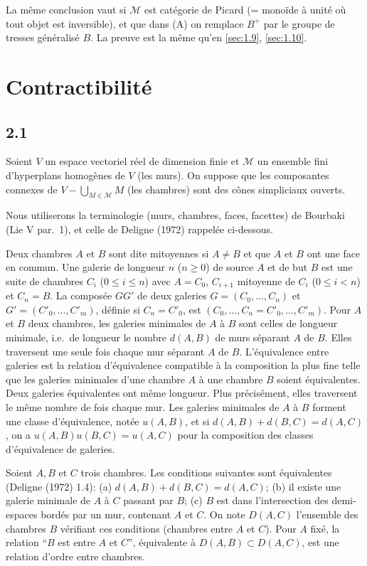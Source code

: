 \documentclass[11pt,a4paper]{article}
\theoremstyle{plain}
\theoremstyle{definition}
\newcommand{\cM}{\mathscr{M}}
\begin{document}
La m\^eme conclusion vaut si $\cM$ est cat\'egorie de Picard (= mono\"ide \`a unit\'e o\`u tout objet est inversible), et que dans (A) on remplace $B^+$ par le groupe de tresses g\'en\'eralis\'e $B$. La preuve est la m\^eme qu'en \ref{sec:1.9}, \ref{sec:1.10}.

\section{Contractibilit\'e}\label{sec:contractibilite}

\subsection*{2.1}

Soient $V$ un espace vectoriel r\'eel de dimension finie et $\cM$ un ensemble fini d'hyperplans homog\`enes de $V$ (les murs). On suppose que les composantes connexes de $V - \bigcup_{M \in \cM} M$ (les chambres) sont des c\^ones simpliciaux ouverts.

Nous utiliserons la terminologie (murs, chambres, faces, facettes) de Bourbaki (Lie V par.~1), et celle de Deligne (1972) rappel\'ee ci-dessous.

Deux chambres $A$ et $B$ sont dite mitoyennes si $A \not= B$ et que $A$ et $B$ ont une face en commun. Une galerie de longueur $n$ ($n \geq 0$) de source $A$ et de but $B$ est une suite de chambres $C_i$ ($0 \leq i \leq n$) avec $A = C_0$, $C_{i+1}$ mitoyenne de $C_i$ ($0 \leq i < n$) et $C_n = B$. La compos\'ee $GG'$ de deux galeries $G = (C_0, \ldots, C_n)$ et $G' = (C'_0, \ldots, C'_m)$, d\'efinie si $C_n = C'_0$, est $(C_0, \ldots, C_n = C'_0, \ldots, C'_m)$. Pour $A$ et $B$ deux chambres, les galeries minimales de $A$ \`a $B$ sont celles de longueur minimale, i.e.\ de longueur le nombre $d(A,B)$ de murs s\'eparant $A$ de $B$. Elles traversent une seule fois chaque mur s\'eparant $A$ de $B$. L'\'equivalence entre galeries est la relation d'\'equivalence compatible \`a la composition la plus fine telle que les galeries minimales d'une chambre $A$ \`a une chambre $B$ soient \'equivalentes. Deux galeries \'equivalentes ont m\^eme longueur. Plus pr\'ecis\'ement, elles traversent le m\^eme nombre de fois chaque mur. Les galeries minimales de $A$ \`a $B$ forment une classe d'\'equivalence, not\'ee $u(A,B)$, et si $d(A,B) + d(B,C) = d(A,C)$, on a $u(A,B) u(B,C) = u(A,C)$ pour la composition des classes d'\'equivalence de galeries.

Soient $A, B$ et $C$ trois chambres. Les conditions suivantes sont \'equivalentes (Deligne (1972) 1.4): (a) $d(A,B) + d(B,C) = d(A,C)$; (b) il existe une galerie minimale de $A$ \`a $C$ passant par $B$; (c) $B$ est dans l'intersection des demi-espaces bord\'es par un mur, contenant $A$ et $C$. On note $D(A,C)$ l'ensemble des chambres $B$ v\'erifiant ces conditions (chambres entre $A$ et $C$). Pour $A$ fix\'e, la relation ``$B$ est entre $A$ et $C$'', \'equivalente \`a $D(A,B) \subset D(A,C)$, est une relation d'ordre entre chambres.
\end{document}
